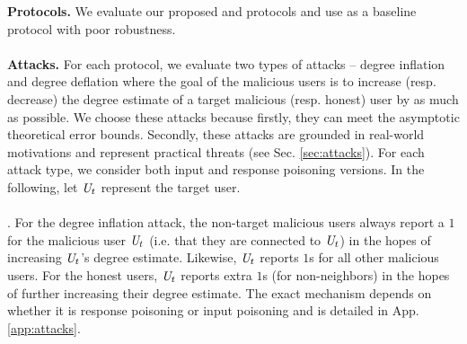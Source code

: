 \noindent \textbf{Protocols.} 
We evaluate our proposed \DegRRCheck{} and \DegHybrid{} protocols and use \DegRRNaive{} as a baseline protocol with poor robustness. %
\vspace{-0.2cm}\\\\
\noindent\textbf{Attacks.} For each protocol, we evaluate two types of attacks -- degree inflation and degree deflation where the goal of the malicious users is to increase (resp. decrease) the degree estimate of a target malicious (resp. honest) user by as much as possible.
 We choose these attacks because firstly, they can meet the asymptotic theoretical error bounds.
Secondly, these attacks are grounded in real-world motivations and represent practical threats (see Sec. \ref{sec:attacks}). For each attack type, we consider both input and response poisoning versions. In the following, let $\textit{U}_t$ represent the target user. 
\vspace{-0.2cm}\\\\
\noindent\DegRRCheck{}. For the degree inflation attack, the non-target malicious users always report a $1$  for the malicious user $\textit{U}_t$ (i.e. that they are connected to $\textit{U}_t$) in the hopes of increasing $\textit{U}_t$'s degree estimate.
Likewise, $\textit{U}_t$ reports $1$s for all other malicious users. For the honest users, $\textit{U}_t$ reports extra $1$s (for non-neighbors) in the hopes of further increasing their degree estimate. The exact mechanism depends on whether it is response poisoning or input poisoning and is detailed in App. \ref{app:attacks}.

